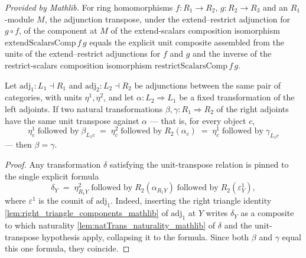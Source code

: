 \begin{lemma}
  \label{lem:homEquiv_extendScalarsComp_mathlib}
  \mathlibok
  \textit{Provided by Mathlib.}
  For ring homomorphisms \(f : R_1 \to R_2\), \(g : R_2 \to R_3\) and an
  \(R_1\)-module \(M\), the adjunction transpose, under the extend--restrict
  adjunction for \(g \circ f\), of the component at \(M\) of the extend-scalars
  composition isomorphism \(\mathrm{extendScalarsComp}\,f\,g\) equals the explicit
  unit composite assembled from the units of the extend--restrict adjunctions for
  \(f\) and \(g\) and the inverse of the restrict-scalars composition isomorphism
  \(\mathrm{restrictScalarsComp}\,f\,g\).
\end{lemma}

\begin{lemma}
  \label{lem:natTrans_ext_of_unit}
  Let \(\mathrm{adj}_1 : L_1 \dashv R_1\) and \(\mathrm{adj}_2 : L_2 \dashv R_2\) be
  adjunctions between the same pair of categories, with units \(\eta^1, \eta^2\), and
  let \(\alpha : L_2 \Rightarrow L_1\) be a fixed transformation of the left adjoints.
  If two natural transformations \(\beta, \gamma : R_1 \Rightarrow R_2\) of the right
  adjoints have the same unit transpose against \(\alpha\) — that is, for every object
  \(c\),
  \[
    \eta^1_c \;\text{followed by}\; \beta_{L_1 c}
    \;=\; \eta^2_c \;\text{followed by}\; R_2(\alpha_c)
    \;=\; \eta^1_c \;\text{followed by}\; \gamma_{L_1 c}
  \]
  — then \(\beta = \gamma\).
\end{lemma}
\begin{proof}
  Any transformation \(\delta\) satisfying the unit-transpose relation is pinned to the
  single explicit formula
  \[
    \delta_Y \;=\; \eta^2_{R_1 Y} \;\text{followed by}\; R_2(\alpha_{R_1 Y})
      \;\text{followed by}\; R_2(\varepsilon^1_Y),
  \]
  where \(\varepsilon^1\) is the counit of \(\mathrm{adj}_1\). Indeed, inserting the
  right triangle identity \cref{lem:right_triangle_components_mathlib} of
  \(\mathrm{adj}_1\) at \(Y\) writes \(\delta_Y\) as a composite to which naturality
  \cref{lem:natTrans_naturality_mathlib} of \(\delta\) and the unit-transpose
  hypothesis apply, collapsing it to the formula. Since both \(\beta\) and \(\gamma\)
  equal this one formula, they coincide.
\end{proof}

